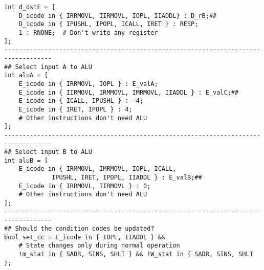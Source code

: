 \documentclass{article}
\begin{document}
\begin{lstlisting}[language={[x86masm]Assembler}]
int d_dstE = [
	D_icode in { IRRMOVL, IIRMOVL, IOPL, IIADDL} : D_rB;##
	D_icode in { IPUSHL, IPOPL, ICALL, IRET } : RESP;
	1 : RNONE;  # Don't write any register
];
-----------------------------------------------------------------------------------
## Select input A to ALU
int aluA = [
	E_icode in { IRRMOVL, IOPL } : E_valA;
	E_icode in { IIRMOVL, IRMMOVL, IMRMOVL, IIADDL } : E_valC;##
	E_icode in { ICALL, IPUSHL } : -4;
	E_icode in { IRET, IPOPL } : 4;
	# Other instructions don't need ALU
];
-----------------------------------------------------------------------------------
## Select input B to ALU
int aluB = [
	E_icode in { IRMMOVL, IMRMOVL, IOPL, ICALL, 
		     IPUSHL, IRET, IPOPL, IIADDL } : E_valB;##
	E_icode in { IRRMOVL, IIRMOVL } : 0;
	# Other instructions don't need ALU
];
-----------------------------------------------------------------------------------
## Should the condition codes be updated?
bool set_cc = E_icode in { IOPL, IIADDL } &&
	# State changes only during normal operation
	!m_stat in { SADR, SINS, SHLT } && !W_stat in { SADR, SINS, SHLT };

\end{lstlisting}
\end{document}
